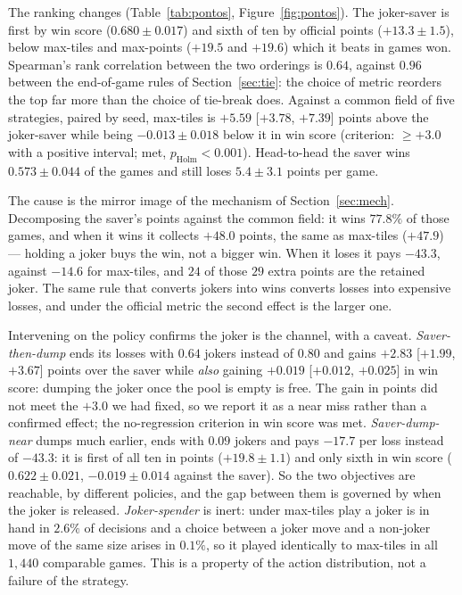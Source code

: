 \documentclass[11pt]{article}
\begin{document}
The ranking changes (Table~\ref{tab:pontos}, Figure~\ref{fig:pontos}). The joker-saver is first by win score ($0.680\pm0.017$) and sixth of ten by official points ($+13.3\pm1.5$), below max-tiles and max-points ($+19.5$ and $+19.6$) which it beats in games won. Spearman's rank correlation between the two orderings is $0.64$, against $0.96$ between the end-of-game rules of Section~\ref{sec:tie}: the choice of metric reorders the top far more than the choice of tie-break does. Against a common field of five strategies, paired by seed, max-tiles is $+5.59$ [$+3.78$, $+7.39$] points above the joker-saver while being $-0.013\pm0.018$ below it in win score (criterion: $\ge+3.0$ with a positive interval; met, $p_{\text{Holm}}<0.001$). Head-to-head the saver wins $0.573\pm0.044$ of the games and still loses $5.4\pm3.1$ points per game.

The cause is the mirror image of the mechanism of Section~\ref{sec:mech}. Decomposing the saver's points against the common field: it wins $77.8\%$ of those games, and when it wins it collects $+48.0$ points, the same as max-tiles ($+47.9$) — holding a joker buys the win, not a bigger win. When it loses it pays $-43.3$, against $-14.6$ for max-tiles, and $24$ of those $29$ extra points are the retained joker. The same rule that converts jokers into wins converts losses into expensive losses, and under the official metric the second effect is the larger one.

Intervening on the policy confirms the joker is the channel, with a caveat. \emph{Saver-then-dump} ends its losses with $0.64$ jokers instead of $0.80$ and gains $+2.83$ [$+1.99$, $+3.67$] points over the saver while \emph{also} gaining $+0.019$ [$+0.012$, $+0.025$] in win score: dumping the joker once the pool is empty is free. The gain in points did not meet the $+3.0$ we had fixed, so we report it as a near miss rather than a confirmed effect; the no-regression criterion in win score was met. \emph{Saver-dump-near} dumps much earlier, ends with $0.09$ jokers and pays $-17.7$ per loss instead of $-43.3$: it is first of all ten in points ($+19.8\pm1.1$) and only sixth in win score ($0.622\pm0.021$, $-0.019\pm0.014$ against the saver). So the two objectives are reachable, by different policies, and the gap between them is governed by when the joker is released. \emph{Joker-spender} is inert: under max-tiles play a joker is in hand in $2.6\%$ of decisions and a choice between a joker move and a non-joker move of the same size arises in $0.1\%$, so it played identically to max-tiles in all $1{,}440$ comparable games. This is a property of the action distribution, not a failure of the strategy.
\end{document}
